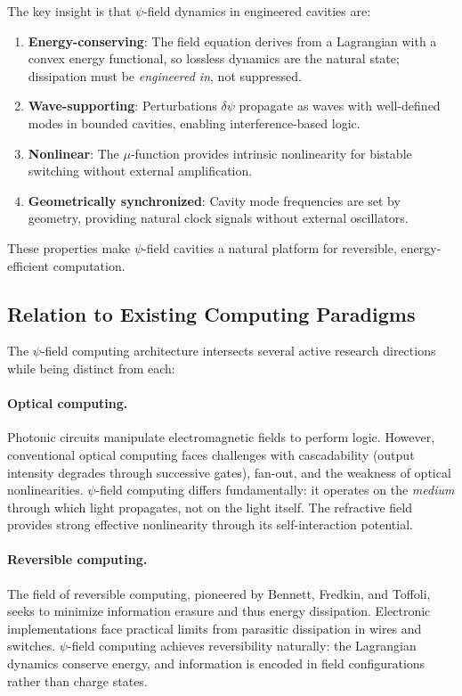 \documentclass[12pt,a4paper,twoside]{article}
\begin{document}
The key insight is that $\psi$-field dynamics in engineered cavities are:
\begin{enumerate}[label=(\roman*)]
\item \textbf{Energy-conserving}: The field equation derives from a Lagrangian with a convex energy functional, so lossless dynamics are the natural state; dissipation must be \emph{engineered in}, not suppressed.
\item \textbf{Wave-supporting}: Perturbations $\delta\psi$ propagate as waves with well-defined modes in bounded cavities, enabling interference-based logic.
\item \textbf{Nonlinear}: The $\mu$-function provides intrinsic nonlinearity for bistable switching without external amplification.
\item \textbf{Geometrically synchronized}: Cavity mode frequencies are set by geometry, providing natural clock signals without external oscillators.
\end{enumerate}

These properties make $\psi$-field cavities a natural platform for reversible, energy-efficient computation.

\subsection{Relation to Existing Computing Paradigms}\label{sec:paradigm_comparison}

The $\psi$-field computing architecture intersects several active research directions while being distinct from each:

\paragraph{Optical computing.}
Photonic circuits manipulate electromagnetic fields to perform logic. However, conventional optical computing faces challenges with cascadability (output intensity degrades through successive gates), fan-out, and the weakness of optical nonlinearities. $\psi$-field computing differs fundamentally: it operates on the \emph{medium} through which light propagates, not on the light itself. The refractive field provides strong effective nonlinearity through its self-interaction potential.

\paragraph{Reversible computing.}
The field of reversible computing, pioneered by Bennett, Fredkin, and Toffoli, seeks to minimize information erasure and thus energy dissipation. Electronic implementations face practical limits from parasitic dissipation in wires and switches. $\psi$-field computing achieves reversibility naturally: the Lagrangian dynamics conserve energy, and information is encoded in field configurations rather than charge states.
\end{document}
